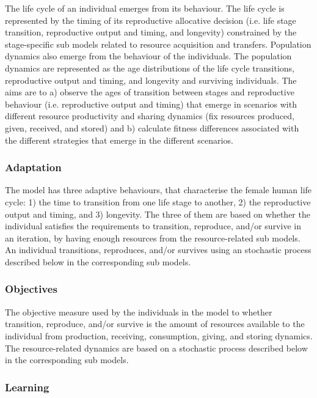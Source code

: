 \documentclass{article}
\begin{document}
The life cycle of an individual emerges from its behaviour. The life cycle is represented by the timing of its reproductive allocative decision (i.e. life stage transition, reproductive output and timing, and longevity) constrained by the stage-specific sub models related to resource acquisition and transfers. Population dynamics also emerge from the behaviour of the individuals. The population dynamics are represented as the age distributions of the life cycle transitions, reproductive output and timing, and longevity and surviving individuals. The aims are to a) observe the ages of transition between stages and reproductive behaviour (i.e. reproductive output and timing) that emerge in scenarios with different resource productivity and sharing dynamics (fix resources produced, given, received, and stored) and b) calculate fitness differences associated with the different strategies that emerge in the different scenarios.

\subsubsection{Adaptation}

The model has three adaptive behaviours, that characterise the female human life cycle: 1) the time to transition from one life stage to another, 2) the reproductive output and timing, and 3) longevity. The three of them are based on whether the individual satisfies the requirements to transition, reproduce, and/or survive in an iteration, by having enough resources from the resource-related sub models. An individual transitions, reproduces, and/or survives using an stochastic process described below in the corresponding sub models.

\subsubsection{Objectives}

The objective measure used by the individuals in the model to whether transition, reproduce, and/or survive is the amount of resources available to the individual from production, receiving, consumption, giving, and storing dynamics. The resource-related dynamics are based on a stochastic process described below in the corresponding sub models.

\subsubsection{Learning}
\end{document}
